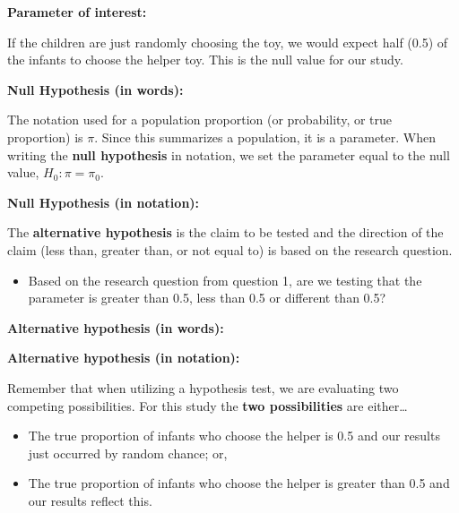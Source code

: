 \documentclass[
]{report}
\providecommand{\tightlist}{%
  \setlength{\itemsep}{0pt}\setlength{\parskip}{0pt}}
\begin{document}
\textbf{Parameter of interest:}

\vspace{0.5in}

If the children are just randomly choosing the toy, we would expect half (0.5) of the infants to choose the helper toy. This is the null value for our study.

\textbf{Null Hypothesis (in words):}

\vspace{0.5in}

The notation used for a population proportion (or probability, or true proportion) is \(\pi\). Since this summarizes a population, it is a parameter. When writing the \textbf{null hypothesis} in notation, we set the parameter equal to the null value, \(H_0: \pi = \pi_0\).

\textbf{Null Hypothesis (in notation):}

\vspace{0.5in}

The \textbf{alternative hypothesis} is the claim to be tested and the direction of the claim (less than, greater than, or not equal to) is based on the research question.

\begin{itemize}
\tightlist
\item
  Based on the research question from question 1, are we testing that the parameter is greater than 0.5, less than 0.5 or different than 0.5?
\end{itemize}

\vspace{0.2in}

\textbf{Alternative hypothesis (in words):}

\vspace{0.5in}

\textbf{Alternative hypothesis (in notation):}

\vspace{0.5in}

Remember that when utilizing a hypothesis test, we are evaluating two competing possibilities. For this study the \textbf{two possibilities} are either\ldots{}

\begin{itemize}
\item
  The true proportion of infants who choose the helper is 0.5 and our results just occurred by random chance; or,
\item
  The true proportion of infants who choose the helper is greater than 0.5 and our results reflect this.
\end{itemize}
\end{document}
